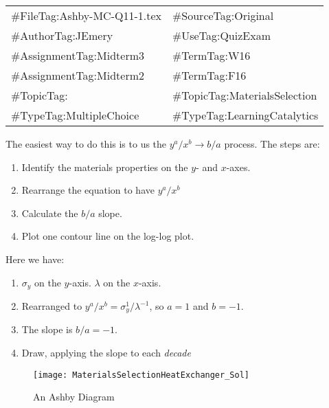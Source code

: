 \begin{FileID}
	\begin{center}
		\begin{tabular}{ll}
			\hline
			\hline
			\#FileTag:Ashby-MC-Q11-1.tex & 	\#SourceTag:Original\\ %
			\#AuthorTag:JEmery & \#UseTag:QuizExam\\ %
			\hline
			\#AssignmentTag:Midterm3 & \#TermTag:W16 \\ %
			\#AssignmentTag:Midterm2 & \#TermTag:F16 \\ %
			\hline
			\#TopicTag: & \#TopicTag:MaterialsSelection\\ %
			\hline
			\#TypeTag:MultipleChoice & \#TypeTag:LearningCatalytics\\
			\hline
		\end{tabular}
	\end{center}
\end{FileID}
%
\begin{solution}

The easiest way to do this is to us the $y^a/x^b \rightarrow b/a$ process. The steps are:

\begin{enumerate}
	\item Identify the materials properties on the $y$- and $x$-axes.
	\item Rearrange the equation to have $y^a/x^b$
	\item Calculate the $b/a$ slope.
	\item Plot one contour line on the log-log plot.
\end{enumerate}

Here we have:

\begin{enumerate}
	\item $\sigma_y$ on the $y$-axis. $\lambda$ on the $x$-axis.
	\item Rearranged to $y^a/x^b = \sigma_y^1/\lambda^{-1}$, so $a = 1$ and $b= -1$. 
	\item The slope is $b/a = -1$.
	\item Draw, applying the slope to each \emph{decade}
\end{enumerate}

\begin{figure}[h]%
	\centering
	\texttt{[image: MaterialsSelectionHeatExchanger\_Sol]}%
	\caption{An Ashby Diagram}%
\end{figure}

\end{solution}

